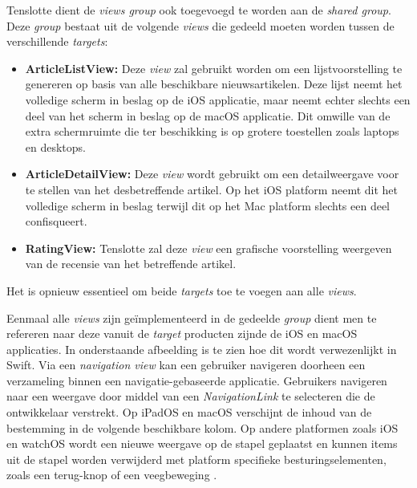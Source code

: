 Tenslotte dient de \textit{views group} ook toegevoegd te worden aan de \textit{shared group}. Deze \textit{group} bestaat uit de volgende \textit{views} die gedeeld moeten worden tussen de verschillende \textit{targets}:

\begin{itemize}
    \item \textbf{ArticleListView:} Deze \textit{view} zal gebruikt worden om een lijstvoorstelling te genereren op basis van alle beschikbare nieuwsartikelen. Deze lijst neemt het volledige scherm in beslag op de iOS applicatie, maar neemt echter slechts een deel van het scherm in beslag op de macOS applicatie. Dit omwille van de extra schermruimte die ter beschikking is op grotere toestellen zoals laptops en desktops.
    \item \textbf{ArticleDetailView:} Deze \textit{view} wordt gebruikt om een detailweergave voor te stellen van het desbetreffende artikel. Op het iOS platform neemt dit het volledige scherm in beslag terwijl dit op het Mac platform slechts een deel confisqueert. 
    \item \textbf{RatingView:} Tenslotte zal deze \textit{view} een grafische voorstelling weergeven van de recensie van het betreffende artikel. 
\end{itemize}

Het is opnieuw essentieel om beide \textit{targets} toe te voegen aan alle \textit{views}.

\pagebreak
Eenmaal alle \textit{views} zijn geïmplementeerd in de gedeelde \textit{group} dient men te refereren naar deze vanuit de \textit{target} producten zijnde de iOS en macOS applicaties. In onderstaande afbeelding is te zien hoe dit wordt verwezenlijkt in Swift. Via een \textit{navigation view} kan een gebruiker navigeren doorheen een verzameling binnen een navigatie-gebaseerde applicatie. Gebruikers navigeren naar een weergave door middel van een \textit{NavigationLink} te selecteren die de ontwikkelaar verstrekt. Op iPadOS en macOS verschijnt de inhoud van de bestemming in de volgende beschikbare kolom. Op andere platformen zoals iOS en watchOS wordt een nieuwe weergave op de stapel geplaatst en kunnen items uit de stapel worden verwijderd met platform specifieke besturingselementen, zoals een terug-knop of een veegbeweging \autocite{AppleDeveloper2022c}.

